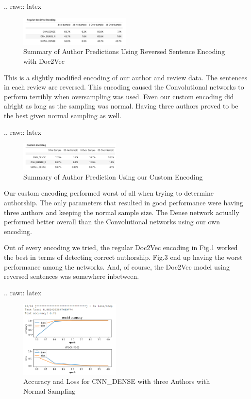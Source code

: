 \documentclass[conference]{IEEEtran}
\begin{document}
.. raw:: latex

   \begin{figure}[h!]
     \centering
       \includegraphics[width=0.5\textwidth]{reversed_Doc2Vec}
     \caption{Summary of Author Predictions Using Reversed Sentence Encoding with Doc2Vec}
   \end{figure}

This is a slightly modified encoding of our author and review data. The
sentences in each review are reversed. This encoding caused the
Convolutional networks to perform terribly when oversampling was used.
Even our custom encoding did alright as long as the sampling was normal.
Having three authors proved to be the best given normal sampling as
well.

.. raw:: latex

   \begin{figure}[h!]
     \centering
       \includegraphics[width=0.45\textwidth]{custom}
     \caption{Summary of Author Prediction Using our Custom Encoding}
   \end{figure}

Our custom encoding performed worst of all when trying to determine
authorship. The only parameters that resulted in good performance were
having three authors and keeping the normal sample size. The Dense
network actually performed better overall than the Convolutional
networks using our own encoding.

Out of every encoding we tried, the regular Doc2Vec encoding in Fig.1
worked the best in terms of detecting correct authorship. Fig.3 end up
having the worst performance among the networks. And, of course, the
Doc2Vec model using reversed sentences was somewhere inbetween.

.. raw:: latex

   \begin{figure}[h!]
     \centering
       \includegraphics[width=0.45\textwidth]{CNN_DENSE_OVERSAMPLING_RESULTS_3_AUTHORS}
     \caption{Accuracy and Loss for CNN\_DENSE with three Authors with Normal Sampling}
   \end{figure}
\end{document}

